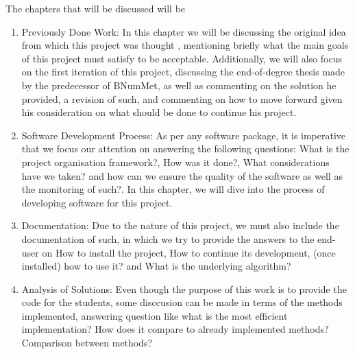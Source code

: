 The chapters that will be discussed will be
\begin{enumerate}
    \item Previously Done Work:
        In this chapter we will be discussing the original idea from which this project was thought , mentioning briefly what the main goals of this project must satisfy to be acceptable. Additionally, we will also focus on the first iteration of this project, discussing the end-of-degree thesis made by the predecessor of BNumMet, as well as commenting on the solution he provided, a revision of such, and commenting on how to move forward given his consideration on what should be done to continue his project.    
    \item Software Development Process:
    As per any software package, it is imperative that we focus our attention on answering the following questions: What is the project organisation framework?, How was it done?, What considerations have we taken? and how can we ensure the quality of the software as well as the monitoring of such?. In this chapter, we will dive into the process of developing software for this project. 
    
    \item Documentation:
    Due to the nature of this project, we must also include the documentation of such, in which we try to provide the answers to the end-user on How to install the project, How to continue its development, (once installed) how to use it? and What is the underlying algorithm?

    \item Analysis of Solutions:
    Even though the purpose of this work is to provide the code for the students, some disccusion can be made in terms of the methods implemented, answering question like what is the most efficient implementation? How does it compare to already implemented methods? Comparison between methods? 
\end{enumerate}